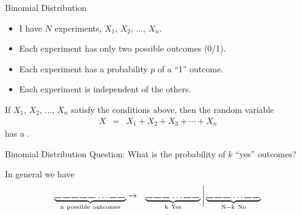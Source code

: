 \begin{frame}{Binomial Distribution}

  \begin{itemize}
  \item I have $N$ experiments, $X_1$, $X_2$, $\ldots$, $X_n$.
  \item Each experiment has only two possible outcomes (0/1).
  \item Each experiment has a probability $p$ of a ``1'' outcome.
  \item Each experiment is independent of the others.
  \end{itemize}

  \vfill

  \begin{definition}
    If $X_1$, $X_2$, $\ldots$, $X_n$ satisfy the conditions above,
    then the random variable
    \begin{eqnarray*}
      X & = & X_1 + X_2 + X_3 + \cdots + X_n
    \end{eqnarray*}
    has a .
  \end{definition}

\end{frame}

\begin{frame}{Binomial Distribution}
    Question: What is the probability of $k$ ``yes'' outcomes?

  \vfill

  In general we have 
  \begin{eqnarray*}
    \underbrace{
      \rule{.3cm}{.2mm} \hspace{.05cm} 
      \rule{.3cm}{.2mm} \hspace{.05cm} 
      \rule{.3cm}{.2mm} \hspace{.05cm} 
      \rule{.3cm}{.2mm} \hspace{.05cm} 
      \rule{.3cm}{.2mm} \hspace{.05cm} \ldots
      \rule{.3cm}{.2mm} \hspace{.05cm} 
      \rule{.3cm}{.2mm} \hspace{.05cm}}_{\mathrm{n~possible~outcomes}}
    & \rightarrow & 
    \underbrace{
      \rule{.3cm}{.2mm} \hspace{.05cm} 
      \rule{.3cm}{.2mm} \hspace{.05cm} 
      \rule{.3cm}{.2mm} \hspace{.05cm} \ldots
      \rule{.3cm}{.2mm} \hspace{.05cm} 
      \rule{.3cm}{.2mm} \hspace{.05cm}}_{\mathrm{k~Yes}}
    \bigg|
    \underbrace{
      \rule{.3cm}{.2mm} \hspace{.05cm} 
      \rule{.3cm}{.2mm} \hspace{.05cm} 
      \rule{.3cm}{.2mm} \hspace{.05cm} \ldots
      \rule{.3cm}{.2mm} \hspace{.05cm} 
      \rule{.3cm}{.2mm} \hspace{.05cm}}_{\mathrm{N-k~No}}
  \end{eqnarray*}

\end{frame}

